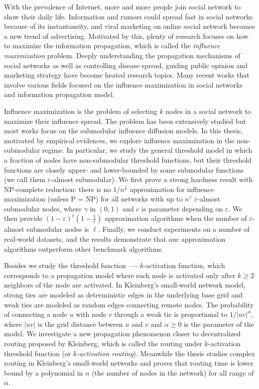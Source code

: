 \begin{englishabstract}

With the prevalence of Internet, more and more people join social network to show their daily life.
Information and rumors could spread fast in social networks because of its instantaneity, and viral marketing on online social network becomes a new trend of advertising. 
Motivated by this, plenty of research focuses on how to maximize the information propagation, which is called the {\it influence maximization} problem.
Deeply understanding the propagation mechanisms of social networks as well as controlling disease spread,
guiding public opinion and marketing strategy have become heated research topics.
Many recent works that involve various fields focused on the influence maximization in social networks and information propagation model.

Influence maximization is the problem of selecting $k$ nodes in a social network to maximize their influence spread.
The problem has been extensively studied but most works focus on the submodular influence diffusion models.
In this thesis, motivated by empirical evidences, we explore influence maximization in the non-submodular regime.
In particular, we study the general threshold model in which a fraction of nodes have non-submodular threshold
	functions, but their threshold functions are closely upper- and lower-bounded by some submodular
	functions (we call them $\varepsilon$-almost submodular).
We first prove a strong hardness result with NP-complete reduction: there is no $1/n^{\frac{\gamma}{c}}$ approximation for influence maximization (unless P = NP)
	for all networks with up to $n^{\gamma}$ $\varepsilon$-almost submodular nodes, where $\gamma$ in $(0,1)$ 
	and $c$ is parameter depending on $\varepsilon$.
We then provide $(1-\varepsilon)^{\ell}(1-\frac{1}{e})$ approximation algorithms when the number of $\varepsilon$-almost submodular nodes is $\ell$.
Finally, we conduct experiments on a number of real-world datasets, and the results demonstrate that our approximation algorithms
	outperform other benchmark algorithms.

Besides we study the threshold function ---- $k$-activation function, 
which corresponds to a propagation model where each node is activated only
after $k \ge 2$ neighbors of the node are activated.
In Kleinberg's small-world network model, strong ties are modeled as deterministic edges in the
underlying base grid and weak ties are modeled as random edges connecting remote nodes.
The probability of connecting a node $u$ with node $v$ through a weak tie is proportional to
$1/|uv|^\alpha$, where $|uv|$ is the grid distance between $u$ and $v$ and $\alpha\ge 0$ is the
parameter of the model.
We investigate a new propagation phenomenon closer to decentralized routing proposed by Kleinberg,
which is called the routing under $k$-activation threshold function (or {\it $k$-activation routing}).
Meanwhile the thesis studies complex routing in Kleinberg's small-world networks and proves that
routing time is lower bound by a polynomial in $n$ (the number of nodes in the network) for all range of $\alpha$.


\end{englishabstract}
